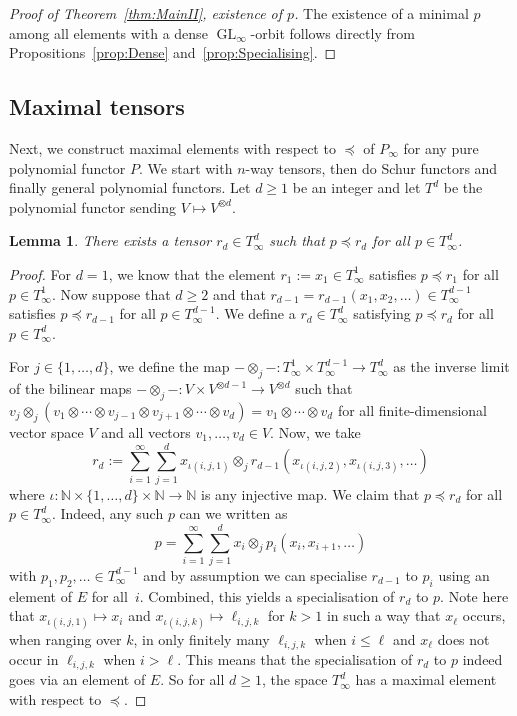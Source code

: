 \documentclass{amsart}
\theoremstyle{plain}
\newtheorem{lm}[thm]{Lemma}
\theoremstyle{definition}
\newcommand{\NN}{\mathbb{N}}
\DeclareMathOperator{\GL}{GL}
\begin{document}
\begin{proof}[Proof of Theorem~\ref{thm:MainII}, existence
of $p$]
The existence of a minimal $p$ among all elements with a dense
$\GL_{\infty}$-orbit follows directly from Propositions~\ref{prop:Dense}
and~\ref{prop:Specialising}.
\end{proof}

\subsection{Maximal tensors} \label{ssec:maximal_class}

Next, we construct maximal elements with respect to $\preceq$ of $P_{\infty}$ for any pure polynomial functor $P$. We start with $n$-way tensors, then do Schur functors and finally general polynomial functors. Let $d\geq 1$ be an integer and let $T^d$ be the polynomial functor sending $V\mapsto V^{\otimes d}$.

\begin{lm}
There exists a tensor $r_d\in T^d_{\infty}$ such that $p\preceq r_d$ for all $p\in T^d_{\infty}$.
\end{lm}
\begin{proof}
For $d=1$, we know that the element $r_1:=x_1\in T^1_{\infty}$ satisfies $p\preceq r_1$ for all $p\in T^1_{\infty}$. Now suppose that $d\geq 2$ and that $r_{d-1}=r_{d-1}(x_1,x_2,\ldots)\in T^{d-1}_{\infty}$ satisfies $p\preceq r_{d-1}$ for all $p\in T^{d-1}_{\infty}$. We define a $r_d\in T^d_{\infty}$ satisfying $p\preceq r_d$ for all $p\in T^d_{\infty}$.

For $j\in\{1,\ldots,d\}$, we define the map $-\otimes_j-\colon T^1_{\infty}\times T^{d-1}_{\infty}\to T^d_{\infty}$ as the inverse limit of the bilinear maps $-\otimes_j-\colon V\times V^{\otimes d-1}\to V^{\otimes d}$ such that $v_j\otimes_j(v_1\otimes \cdots \otimes v_{j-1}\otimes v_{j+1}\otimes\cdots\otimes v_d)=v_1\otimes\cdots\otimes v_d$ for all finite-dimensional vector space $V$ and all vectors $v_1,\ldots,v_d\in V$. Now, we take
\[
r_d:=\sum_{i=1}^{\infty}\sum_{j=1}^dx_{\iota(i,j,1)}\otimes_j r_{d-1}(x_{\iota(i,j,2)},x_{\iota(i,j,3)},\ldots)
\]
where $\iota\colon\NN\times \{1,\ldots,d\}\times\NN\to\NN$ is any injective map. We claim that $p\preceq r_d$ for all $p\in T^d_{\infty}$. Indeed, any such $p$ can we written as
\[
p=\sum_{i=1}^{\infty}\sum_{j=1}^dx_i\otimes_j p_i(x_i,x_{i+1},\ldots)
\]
with $p_1,p_2,\ldots\in T^{d-1}_{\infty}$ and by assumption
we can specialise $r_{d-1}$ to $p_i$ using an element of $E$
for all~$i$. Combined, this yields a specialisation of $r_d$
to $p$. Note here that $x_{\iota(i,j,1)}\mapsto x_i$ and
$x_{\iota(i,j,k)}\mapsto\ell_{i,j,k}$ for $k>1$ in such a
way that $x_{\ell}$ occurs, when ranging over $k$, in only
finitely many $\ell_{i,j,k}$ when $i\leq \ell$ and $x_{\ell}$ does not occur in $\ell_{i,j,k}$ when $i>\ell$. This means that the specialisation of $r_d$ to $p$ indeed goes via an element of $E$. So for all $d\geq 1$, the space $T^d_{\infty}$ has a maximal element with respect to $\preceq$.
\end{proof}
\end{document}
